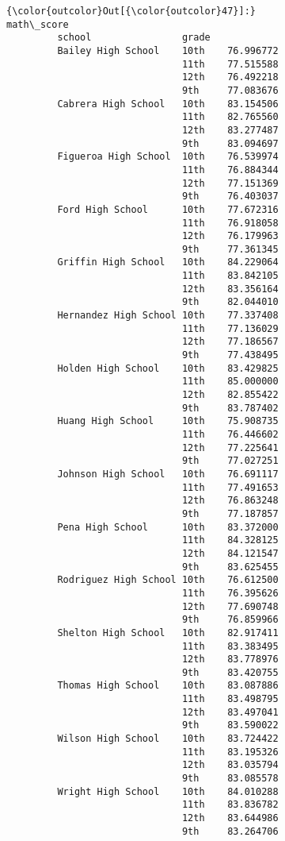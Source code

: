 \documentclass[11pt]{article}
\begin{document}
\begin{Verbatim}[commandchars=\\\{\}]
{\color{outcolor}Out[{\color{outcolor}47}]:}                              math\_score
         school                grade            
         Bailey High School    10th    76.996772
                               11th    77.515588
                               12th    76.492218
                               9th     77.083676
         Cabrera High School   10th    83.154506
                               11th    82.765560
                               12th    83.277487
                               9th     83.094697
         Figueroa High School  10th    76.539974
                               11th    76.884344
                               12th    77.151369
                               9th     76.403037
         Ford High School      10th    77.672316
                               11th    76.918058
                               12th    76.179963
                               9th     77.361345
         Griffin High School   10th    84.229064
                               11th    83.842105
                               12th    83.356164
                               9th     82.044010
         Hernandez High School 10th    77.337408
                               11th    77.136029
                               12th    77.186567
                               9th     77.438495
         Holden High School    10th    83.429825
                               11th    85.000000
                               12th    82.855422
                               9th     83.787402
         Huang High School     10th    75.908735
                               11th    76.446602
                               12th    77.225641
                               9th     77.027251
         Johnson High School   10th    76.691117
                               11th    77.491653
                               12th    76.863248
                               9th     77.187857
         Pena High School      10th    83.372000
                               11th    84.328125
                               12th    84.121547
                               9th     83.625455
         Rodriguez High School 10th    76.612500
                               11th    76.395626
                               12th    77.690748
                               9th     76.859966
         Shelton High School   10th    82.917411
                               11th    83.383495
                               12th    83.778976
                               9th     83.420755
         Thomas High School    10th    83.087886
                               11th    83.498795
                               12th    83.497041
                               9th     83.590022
         Wilson High School    10th    83.724422
                               11th    83.195326
                               12th    83.035794
                               9th     83.085578
         Wright High School    10th    84.010288
                               11th    83.836782
                               12th    83.644986
                               9th     83.264706
\end{Verbatim}
            
\end{document}
